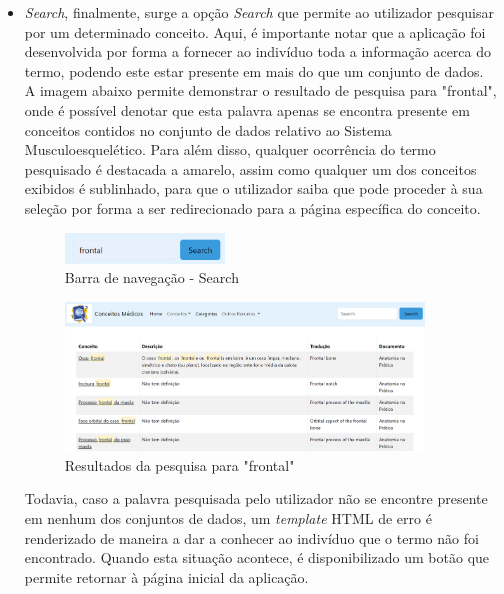 \begin{itemize}
    \item \textit{Search}, finalmente, surge a opção \textit{Search} que permite ao utilizador pesquisar por um determinado conceito. Aqui, é importante notar que a aplicação foi desenvolvida por forma a fornecer ao indivíduo toda a informação acerca do termo, podendo este estar presente em mais do que um conjunto de dados.\\
    A imagem abaixo permite demonstrar o resultado de pesquisa para "frontal", onde é possível denotar que esta palavra apenas se encontra presente em conceitos contidos no conjunto de dados relativo ao Sistema Musculoesquelético. Para além disso, qualquer ocorrência do termo pesquisado é destacada a amarelo, assim como qualquer um dos conceitos exibidos é sublinhado, para que o utilizador saiba que pode proceder à sua seleção por forma a ser redirecionado para a página específica do conceito.

    \begin{figure}[H]
        \centering
        \centering
        \includegraphics[width=0.4\textwidth]{Images/pesquisa1.png}
        \caption{Barra de navegação - Search}
        \label{fig:dic-traduc1}
    \end{figure}

    \begin{figure}[H]
        \centering
        \centering
        \includegraphics[width=0.9\textwidth]{Images/pesquisa2.png}
        \caption{Resultados da pesquisa para "frontal"}
        \label{fig:dic-traduc1}
    \end{figure}

    Todavia, caso a palavra pesquisada pelo utilizador não se encontre presente em nenhum dos conjuntos de dados, um \textit{template} HTML de erro é renderizado de maneira a dar a conhecer ao indivíduo que o termo não foi encontrado. Quando esta situação acontece, é disponibilizado um botão que permite retornar à página inicial da aplicação.


\end{itemize}

